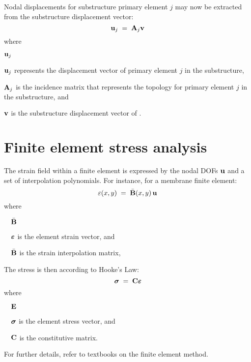 {Nodal displacements for substructure primary element $j$ may now be extracted
from the substructure displacement vector:
%
\begin{equation}
{\bf u}_j \;=\; {\bf A}_j {\bf v}
\label{eqK43:13}
\end{equation}
%
where
%
\begin{namelist}{${\bf u}_j$}
\item[${\bf u}_j$] represents the displacement vector of primary element $j$
in the substructure,
\item[${\bf A}_j$] is the incidence matrix that represents the topology
for primary element $j$ in the substructure, and
\item[${\bf v}$] is the substructure displacement vector of .
\end{namelist}

\section{Finite element stress analysis}

The strain field within a finite element is expressed by the nodal DOFs
${\bf u}$ and a set of interpolation polynomials.
For instance, for a membrane finite element:
%
\begin{equation}
{\bf \varepsilon}(x,y) \;=\; \bar{\bf B}(x,y)\,{\bf u}
\label{eqK43:17}
\end{equation}
%
where
%
\begin{namelist}{$\quad\bar{\bf B}$}
\item[$\quad{\boldsymbol{\varepsilon}}$] is the element strain vector, and
\item[$\quad\bar{\bf B}$]      is the strain interpolation matrix,
\end{namelist}
%
The stress is then according to Hooke's Law:
%
\begin{equation}
{\boldsymbol{\sigma}} \;=\; {\bf C} {\boldsymbol{\varepsilon}}
\label{eqK43:18}
\end{equation}
%
where
%
\begin{namelist}{$\quad{\bf E}$}
\item[$\quad{\boldsymbol{\sigma}}$] is the element stress vector, and
\item[$\quad{\bf C}$] is the constitutive matrix.
\end{namelist}
%
For further details, refer to textbooks on the finite element method.


} %

\iftoggle{publicedition}{}{%

} %

